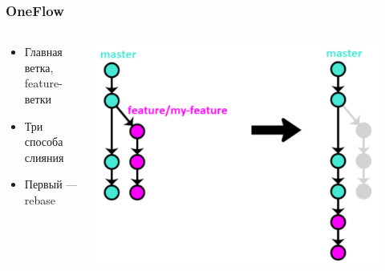 \documentclass{../../slides-style}
\begin{document}
    \begin{frame}
        \frametitle{OneFlow}
        \begin{columns}
            \begin{column}{0.4\textwidth}
                \begin{itemize}
                    \item Главная ветка, feature-ветки
                    \item Три способа слияния
                    \item Первый --- rebase
                \end{itemize}
            \end{column}
            \begin{column}{0.6\textwidth}
                \begin{center}
                    \includegraphics[width=0.9\textwidth]{oneflow1.png}
                \end{center}
            \end{column}
        \end{columns}
    \end{frame}
\end{document}
